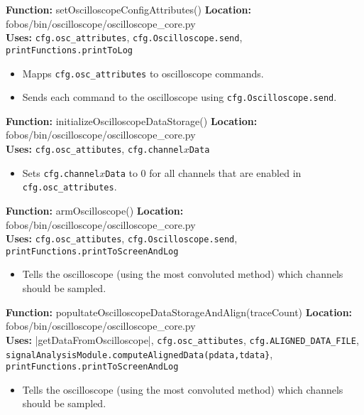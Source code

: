 \begin{cergbox}{\textbf{Function:} setOscilloscopeConfigAttributes()}
  \textbf{Location:} fobos/bin/oscilloscope/oscilloscope\_core.py \\
  \textbf{Uses:} \verb|cfg.osc_attributes|, \verb|cfg.Oscilloscope.send|, \verb|printFunctions.printToLog| 
  \tcblower
  \begin{itemize}
    \item Mapps \verb|cfg.osc_attributes| to oscilloscope commands.
    \item Sends each command to the oscilloscope using \verb|cfg.Oscilloscope.send|.
  \end{itemize}
\end{cergbox}

\begin{cergbox}{\textbf{Function:} initializeOscilloscopeDataStorage()}
  \textbf{Location:} fobos/bin/oscilloscope/oscilloscope\_core.py \\
  \textbf{Uses:} \verb|cfg.osc_attibutes|, \verb|cfg.channel|$x$\verb|Data| 
  \tcblower
  \begin{itemize}
    \item Sets \verb|cfg.channel|$x$\verb|Data| to 0 for all channels that are enabled
          in \verb|cfg.osc_attributes|.
  \end{itemize}
\end{cergbox}

\begin{cergbox}{\textbf{Function:} armOscilloscope()}
  \textbf{Location:} fobos/bin/oscilloscope/oscilloscope\_core.py \\
  \textbf{Uses:} \verb|cfg.osc_attibutes|, \verb|cfg.Oscilloscope.send|, \verb|printFunctions.printToScreenAndLog|
  \tcblower
  \begin{itemize}
    \item Tells the oscilloscope (using the most convoluted method) which channels
          should be sampled.
  \end{itemize}
\end{cergbox}

\begin{cergbox}{\textbf{Function:} popultateOscilloscopeDataStorageAndAlign(traceCount)}
  \textbf{Location:} fobos/bin/oscilloscope/oscilloscope\_core.py \\
  \textbf{Uses:} \verg|getDataFromOscilloscope|, \verb|cfg.osc_attibutes|, \verb|cfg.ALIGNED_DATA_FILE|, \verb|signalAnalysisModule.computeAlignedData(pdata,tdata}|, \verb|printFunctions.printToScreenAndLog|
  \tcblower
  \begin{itemize}
    \item Tells the oscilloscope (using the most convoluted method) which channels
          should be sampled.
  \end{itemize}
\end{cergbox}
